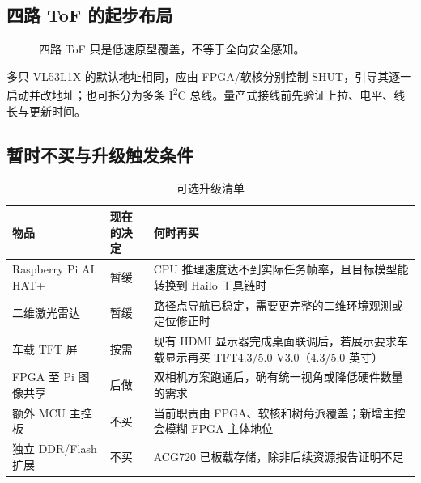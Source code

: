 \documentclass[UTF8,a4paper,zihao=-4,fontset=fandol]{ctexart}
\begin{document}
\subsection{四路 ToF 的起步布局}

\begin{figure}[H]\centering
{}
\caption{四路 ToF 只是低速原型覆盖，不等于全向安全感知。}
\end{figure}

多只 VL53L1X 的默认地址相同，应由 FPGA/软核分别控制 SHUT，引导其逐一启动并改地址；也可拆分为多条 I\textsuperscript{2}C 总线。量产式接线前先验证上拉、电平、线长与更新时间。\cite{tof}

\subsection{暂时不买与升级触发条件}

\begin{table}[H]\small
\caption{可选升级清单}\label{tab:optional}
\begin{tabularx}{\linewidth}{@{}L{3.2cm}L{3.4cm}Y@{}}\toprule
\textbf{物品} & \textbf{现在的决定} & \textbf{何时再买}\\\midrule
Raspberry Pi AI HAT+ & 暂缓 & CPU 推理速度达不到实际任务帧率，且目标模型能转换到 Hailo 工具链时\cite{aihat}\\
二维激光雷达 & 暂缓 & 路径点导航已稳定，需要更完整的二维环境观测或定位修正时\\
车载 TFT 屏 & 按需 & 现有 HDMI 显示器完成桌面联调后，若展示要求车载显示再买 TFT4.3/5.0 V3.0（4.3/5.0 英寸）\cite{displaymanual}\\
FPGA 至 Pi 图像共享 & 后做 & 双相机方案跑通后，确有统一视角或降低硬件数量的需求\\
额外 MCU 主控板 & 不买 & 当前职责由 FPGA、软核和树莓派覆盖；新增主控会模糊 FPGA 主体地位\\
独立 DDR/Flash 扩展 & 不买 & ACG720 已板载存储，除非后续资源报告证明不足\\\bottomrule
\end{tabularx}
\end{table}
\end{document}
